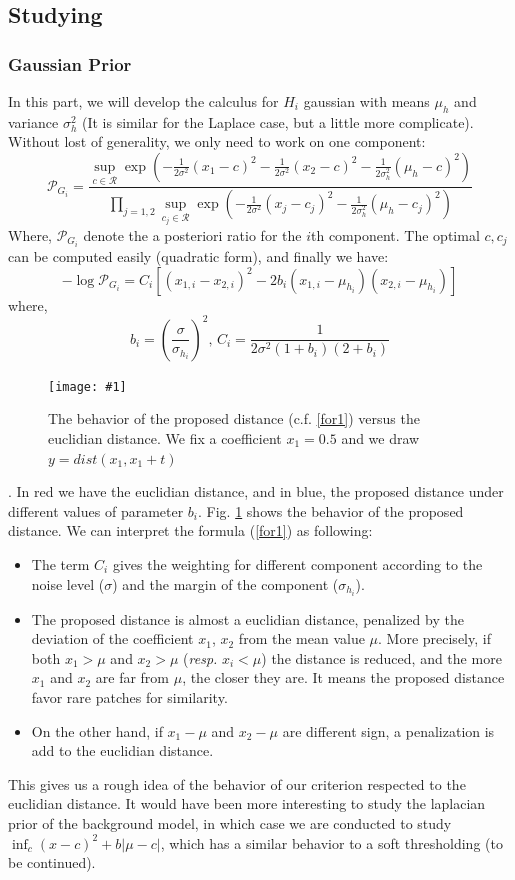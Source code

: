 \documentclass[runningheads]{llncs}
\newcommand{\insertF}[4]{
  \begin{figure}[h!]
    \centering
    \begin{minipage}{#3\linewidth}
    \texttt{[image: \#1]}
    \end{minipage}  
      \caption{#2}
      \label{#4}
  \end{figure}  
}
\newcommand{\wdist}[3]{\frac{1}{2#3}(#1-#2 )^2}
\begin{document}
\subsection{Studying}
\subsubsection{Gaussian Prior}
In this part, we will develop the calculus for $H_i$ gaussian with means $\mu_h$ and variance $\sigma_h^2$ (It is similar for the Laplace case, but a little more complicate). Without lost of generality, we only need to work on one component:
\[
 \mathcal{P}_{G_i} = \frac{\sup_{c\in \mathcal{R}} \exp(-\wdist{x_1}{c}{\sigma^2}-\wdist{x_2}{c}{\sigma^2}-\wdist{\mu_h}{c}{\sigma_h^2}) }
{\prod_{j=1,2}\sup_{c_j\in \mathcal{R}} \exp(-\frac{1}{2\sigma^2}(x_j-c_j )^2-\wdist{\mu_h}{c_j}{\sigma_h^2})  }
\]
Where, $\mathcal{P}_{G_i}$ denote the a posteriori ratio for the $i$th component. The optimal $c, c_j$ can be computed easily (quadratic form), and finally we have:
\begin{equation}
 -\log \mathcal{P}_{G_i}= C_i [ (x_{1,i}-x_{2,i})^2 -2b_i(x_{1,i}-\mu_{h_i})(x_{2,i}-\mu_{h_i})]
 \label{for1}
\end{equation}
where,
\[b_i=(\frac{\sigma}{\sigma_{h_i}})^2\text{, }C_i=\frac{1}{2\sigma^2(1+b_i)(2+b_i)}\]
\insertF{curve}{The behavior of the proposed distance (c.f. \ref{for1}) versus the euclidian distance. We fix a coefficient $x_1=0.5$ and we draw $y=dist(x_1,x_1+t)$}{0.8}{curv}. In red we have the euclidian distance, and in blue, the proposed distance under different values of parameter $b_i$.
Fig. \ref{curv} shows the behavior of the proposed distance. We can interpret the formula (\ref{for1}) as following:
\begin{itemize}
 \item The term $C_i$ gives the weighting for different component according to the noise level ($\sigma$) and the margin of the component ($\sigma_{h_i}$).
 \item The proposed distance is almost a euclidian distance, penalized by the deviation of the coefficient $x_1$, $x_2$ from the mean value $\mu$. More precisely, if both $x_1>\mu$ and $x_2>\mu$ (\textit{resp.} $x_i<\mu$) the distance is reduced, and the more $x_1$ and $x_2$ are far from $\mu$, the closer they are. It means the proposed distance favor rare patches for similarity.
 \item On the other hand, if $x_1-\mu$ and $x_2-\mu$ are different sign, a penalization is add to the euclidian distance. 
\end{itemize}
This gives us a rough idea of the behavior of our criterion respected to the euclidian distance. It would have been more interesting to study the laplacian prior of the background model, in which case we are conducted to study $\inf_c (x-c)^2+b|\mu-c|$, which has a similar behavior to a soft thresholding (to be continued). 
\end{document}
